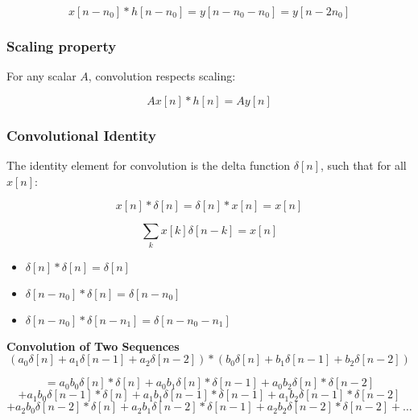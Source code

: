 \begin{warning}
    \[
x[n - n_0] * h[n - n_0] = y[n - n_0 - n_0] = y[n - 2n_0]
\]
\end{warning}
    
\subsubsection{Scaling property}
\begin{definition}
For any scalar \(A\), convolution respects scaling:

\begin{equation}
A x[n] * h[n] = A y[n]
\end{equation}
\end{definition}
    
\subsubsection{Convolutional Identity}
\begin{definition}
The identity element for convolution is the delta function \(\delta[n]\), such that for all \(x[n]\):

\begin{equation}
x[n] * \delta[n] = \delta[n] * x[n] = x[n]
\end{equation}
    
\end{definition}

\begin{derivation}
    \begin{equation}
        \sum_k x[k] \delta[n - k] = x[n]
    \end{equation}
    
    \begin{itemize}
        \item \(\delta[n] * \delta[n] = \delta[n]\)
        \item \(\delta[n - n_0] * \delta[n] = \delta[n - n_0]\)
        \item \(\delta[n - n_0] * \delta[n - n_1] = \delta[n - n_0 - n_1]\)
    \end{itemize}
\end{derivation}

\begin{example}
\textbf{Convolution of Two Sequences}
\[
(a_0 \delta[n] + a_1 \delta[n-1] + a_2 \delta[n-2]) * (b_0 \delta[n] + b_1 \delta[n-1] + b_2 \delta[n-2])
\]

\[
= a_0 b_0 \delta[n] * \delta[n] + a_0 b_1 \delta[n] * \delta[n-1] + a_0 b_2 \delta[n] * \delta[n-2] 
\]
\[
+ a_1 b_0 \delta[n-1] * \delta[n] + a_1 b_1 \delta[n-1] * \delta[n-1] + a_1 b_2 \delta[n-1] * \delta[n-2]
\]
\[
+ a_2 b_0 \delta[n-2] * \delta[n] + a_2 b_1 \delta[n-2] * \delta[n-1] + a_2 b_2 \delta[n-2] * \delta[n-2] + \dots
\]
\end{example}